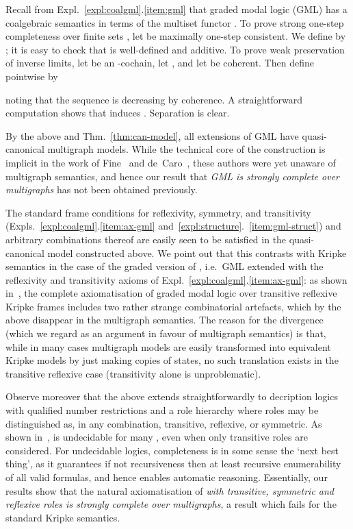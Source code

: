 \documentclass[proceedings]{stacs}
\theoremstyle{definition}
\theoremstyle{plain}
\begin{document}
\begin{exa}\label{expl:gml-infty}
  Recall from Expl.~\ref{expl:coalgml}.\ref{item:gml} that graded
  modal logic (GML) has a coalgebraic semantics in terms of the multiset
  functor . To prove strong one-step completeness over
  finite sets , let  be
  maximally one-step consistent. We define  by
  ; it is easy to check that  is
  well-defined and additive. To prove weak preservation of inverse
  limits, let  be an -cochain, let , and
  let  be coherent. Then define
   pointwise by

noting that the sequence  is decreasing by coherence. A
straightforward computation shows that  induces . Separation
is clear.

By the above and Thm.~\ref{thm:can-model}, all extensions of GML have
quasi-canonical multigraph models. While the technical core of the
construction is implicit in the work of Fine~\cite{Fine72} and
de~Caro~\cite{DeCaro88}, these authors were yet unaware of multigraph
semantics, and hence our result that \emph{GML is strongly complete
  over multigraphs} has not been obtained previously. 



The standard frame conditions for reflexivity, symmetry, and
transitivity (Expls.~\ref{expl:coalgml}.\ref{item:ax-gml}
and~\ref{expl:structure}.~\ref{item:gml-struct}) and arbitrary
combinations thereof are easily seen to be satisfied in the
quasi-canonical model constructed above. We point out that this
contrasts with Kripke semantics in the case of the graded version of
, i.e.\ GML extended with the reflexivity and transitivity axioms
of Expl.~\ref{expl:coalgml}.\ref{item:ax-gml}: as shown
in~\cite{FattorosiBarnabaCerrato88}, the complete axiomatisation of
graded modal logic over transitive reflexive Kripke frames includes
two rather strange combinatorial artefacts, which by the above
disappear in the multigraph semantics. The reason for the divergence
(which we regard as an argument in favour of multigraph semantics) is
that, while in many cases multigraph models are easily transformed
into equivalent Kripke models by just making copies of states, no such
translation exists in the transitive reflexive case (transitivity
alone is unproblematic).

Observe moreover that the above extends straightforwardly to
decription logics  with qualified number restrictions
and a role hierarchy  where roles may be distinguished as, in
any combination, transitive, reflexive, or symmetric. As shown
in~\cite{HorrocksEA99,KazakovEA07},  is undecidable for
many , even when only transitive roles are considered. For
undecidable logics, completeness is in some sense the `next best
thing', as it guarantees if not recursiveness then at least recursive
enumerability of all valid formulas, and hence enables automatic
reasoning. Essentially, our results show that the natural
axiomatisation of \emph{ with transitive, symmetric and
  reflexive roles is strongly complete over multigraphs}, a result
which fails for the standard Kripke semantics.
\end{exa}
\end{document}
